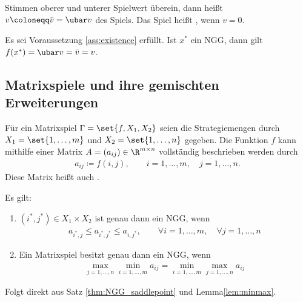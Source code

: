 \begin{definition*}
  Stimmen oberer und unterer Spielwert überein, dann heißt $v \coloneqq \bar v = \ubar v$  des Spiels. Das Spiel heißt , wenn $v = 0$. 
\end{definition*}
\begin{korollar}
  Es sei Voraussetzung \ref{ass:existence} erfüllt. Ist $x^{*}$ ein NGG, dann gilt $f(x^{*}) = \ubar v = \bar v = v$. 
\end{korollar}

\subsection{Matrixspiele und ihre gemischten Erweiterungen}
\label{sec:matrixspiele}

Für ein Matrixspiel $\Gamma= \set{f, X_{1}, X_{2}}$ seien die Strategiemengen durch $X_{1} = \set{1, \dots, m}$ und $X_{2} = \set{1, \dots, n}$ gegeben. Die Funktion $f$ kann mithilfe einer Matrix $A = (a_{ij}) \in \R^{m \times n}$ vollständig beschrieben werden durch
\begin{align*}
  a_{ij} \coloneqq f(i, j), \qquad i = 1, \dots, m, \quad j = 1, \dots , n.
\end{align*}
Diese Matrix heißt auch .
\begin{satz}
  Es gilt:
\enu{\alph}
  \begin{enumerate}
  \item $(i^{*}, j^{*})\in X_{1} \times X_{2}$ ist genau dann ein NGG, wenn
    \begin{align}\label{eq:NGG_matrix}
      a_{i^{*}, j} \leq a_{i^{*}, j^{*}} \leq a_{i, j^{*}}, \qquad \forall i = 1, \dots, m, \quad \forall j = 1, \dots, n
    \end{align}
\item Ein Matrixspiel besitzt genau dann ein NGG, wenn
  \begin{align*}
    \max_{j = 1, \dots, n} \min_{i = 1, \dots, m} a_{ij} = \min_{i = 1, \dots, m} \max_{j = 1, \dots, n} a_{ij} 
  \end{align*}
  \end{enumerate}
\end{satz}
\begin{beweis}
  Folgt direkt aus Satz \ref{thm:NGG_saddlepoint} und Lemma\ref{lem:minmax}. 
\end{beweis}

